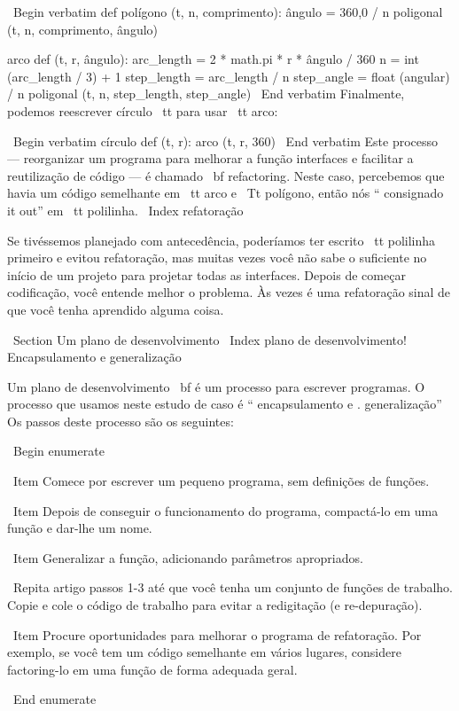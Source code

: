 \documentclass[10pt]{book}
\begin{document}
{\ Begin {verbatim}
def polígono (t, n, comprimento):
    ângulo = 360,0 / n
    poligonal (t, n, comprimento, ângulo)

arco def (t, r, ângulo):
    arc_length = 2 * math.pi * r * ângulo / 360
    n = int (arc_length / 3) + 1
    step_length = arc_length / n
    step_angle = float (angular) / n
    poligonal (t, n, step_length, step_angle)
\ End {verbatim}
%
Finalmente, podemos reescrever {círculo \ tt} para usar {\ tt arco}:

\ Begin {verbatim}
círculo def (t, r):
    arco (t, r, 360)
\ End {verbatim}
%
Este processo --- reorganizar um programa para melhorar a função
interfaces e facilitar a reutilização de código --- é chamado {\ bf refactoring}.
Neste caso, percebemos que havia um código semelhante em {\ tt arco} e
{\ Tt polígono}, então nós `` consignado it out'' em {\ tt polilinha}.
\ Index {} refatoração

Se tivéssemos planejado com antecedência, poderíamos ter escrito {\ tt polilinha} primeiro
e evitou refatoração, mas muitas vezes você não sabe o suficiente no
início de um projeto para projetar todas as interfaces. Depois de começar
codificação, você entende melhor o problema. Às vezes é uma refatoração
sinal de que você tenha aprendido alguma coisa.


\ Section {Um plano de desenvolvimento}
\ Index {plano de desenvolvimento! Encapsulamento e generalização}

Um plano de desenvolvimento {\ bf} é um processo para escrever programas.
O processo que usamos
neste estudo de caso é `` encapsulamento e
. generalização'' Os passos deste processo são os seguintes:

\ Begin {enumerate}

\ Item Comece por escrever um pequeno programa, sem definições de funções.

\ Item Depois de conseguir o funcionamento do programa, compactá-lo em uma função
e dar-lhe um nome.

\ Item Generalizar a função, adicionando parâmetros apropriados.

\ Repita artigo passos 1-3 até que você tenha um conjunto de funções de trabalho.
Copie e cole o código de trabalho para evitar a redigitação (e re-depuração).

\ Item Procure oportunidades para melhorar o programa de refatoração.
Por exemplo, se você tem um código semelhante em vários lugares, considere
factoring-lo em uma função de forma adequada geral.

\ End {enumerate}

}
\end{document}
